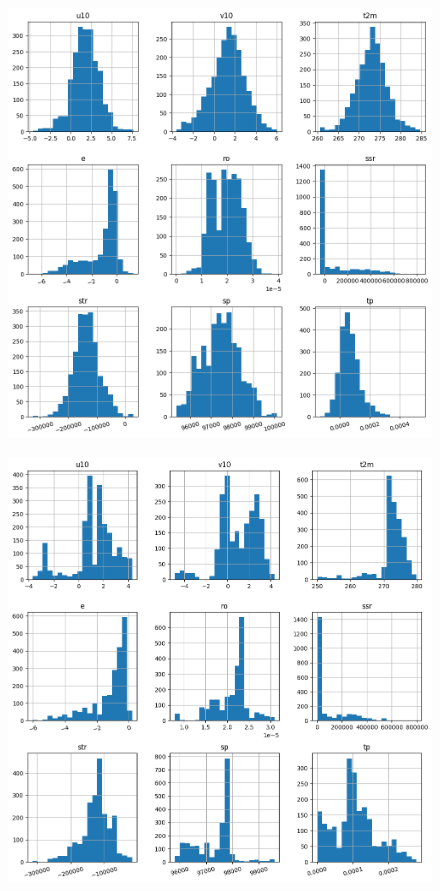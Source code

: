 \begin{figure}[H]
    \centering
    \includegraphics[width=\textwidth]{images/svr_hist.png}
    \caption{}
    \label{svr-hist}
\end{figure}

\begin{figure}[H]
    \centering
    \includegraphics[width=\textwidth]{images/dt_hist.png}
    \caption{}
    \label{dt-hist}
\end{figure}

